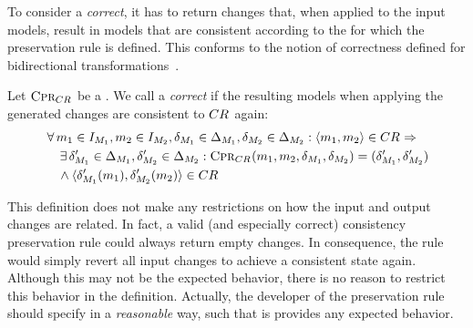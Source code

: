 To consider a \modellevelconsistencypreservationrule \emph{correct}, it has to return changes that, when applied to the input models, result in models that are consistent according to the \modellevelconsistencyrelation for which the preservation rule is defined.
This conforms to the notion of correctness defined for bidirectional transformations~\cite{stevens2010sosym}.

\begin{definition}
    \label{def:consistencypreservationrulecorrectness}
    Let $\textsc{Cpr}_{CR_{}}$ be a \emph{\modellevelconsistencypreservationrule}.
    We call a \modellevelconsistencypreservationrule \emph{correct} if the resulting models when applying the generated changes are consistent to $CR_{}$ again:
    \begin{align*}
        &
        \forall 
        \model{m}{1} \in \metamodelinstanceset{M}{1}, 
        \model{m}{2} \in \metamodelinstanceset{M}{2},
        \change{\metamodel{M}{1}} \in \changeuniverse{\metamodel{M}{1}},
        \change{\metamodel{M}{2}} \in \changeuniverse{\metamodel{M}{2}} :
        \tupled{\model{m}{1}, \model{m}{2}} \in \consistencyrelation{CR}{} \Rightarrow\\
        & \formulaskip
        \exists 
        \change{\metamodel{M}{1}}' \in \changeuniverse{\metamodel{M}{1}},
        \change{\metamodel{M}{2}}' \in \changeuniverse{\metamodel{M}{2}} :
        \consistencypreservationrule{\consistencyrelation{CR}{}}(\model{m}{1}, \model{m}{2}, \change{\metamodel{M}{1}}, \change{\metamodel{M}{2}}) = (\change{\metamodel{M}{1}}', \change{\metamodel{M}{2}}') \\
        & \formulaskip
        \land \tupled{\change{\metamodel{M}{1}}'(\model{m}{1}), \change{\metamodel{M}{2}}'(\model{m}{2})} \in \consistencyrelation{CR}{}
    \end{align*}
\end{definition}

This definition does not make any restrictions on how the input and output changes are related.
In fact, a valid (and especially correct) \gls{consistency preservation rule} could always return empty changes.
In consequence, the rule would simply revert all input changes to achieve a consistent state again.
Although this may not be the expected behavior, there is no reason to restrict this behavior in the definition.
Actually, the developer of the preservation rule should specify in a \emph{reasonable} way, such that is provides any expected behavior.


